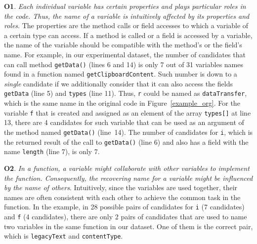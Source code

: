 \textbf{O1}. \textit{Each individual variable has certain properties
  and plays particular roles in the code. Thus, the name of a variable
  is intuitively affected by its properties and roles}. The properties
are the method calls or field accesses to which a variable of a certain
type can access.
%
If a method is called or a field is accessed
by a variable, the name of the variable should be compatible with the
method's or the field's name.
%
%
%
For example, in our experimental dataset,
the number of candidates that can call method \texttt{getData()}
(lines 6 and 14) is only 7 out of 31 variables names found in a
function named \texttt{getClipboardContent}.
%
%
Such number is down to a \textit{single} candidate if we additionally
consider that it can also access the fields \texttt{getData} (line 5)
and \texttt{types} (line 11). Thus, \texttt{r} could be named
as \texttt{dataTransfer}, which is the same name in the
original code in Figure~\ref{example_org}. For the variable \texttt{f}
that is created and assigned as an element of the array
\texttt{types[]} at line 13, there are 4 candidates for such
variable that can be used as an argument of the method named
\texttt{getData()} (line~14). The number of candidates for \texttt{i},
which is the returned result of the call to \texttt{getData()} (line
6) and also has a field with the name \texttt{length} (line 7), is
only 7.

%
\textbf{O2}. \textit{In a function, a variable might collaborate with
  other variables to implement the function. Consequently, the
  recovering name for a variable might be influenced by the name of
  others}. Intuitively, since the variables are used together, their
names are often consistent with each other to achieve the
common task in the function.
%
In the example, in 28 possible pairs of candidates for \texttt{i} (7
candidates) and \texttt{f} (4 candidates), there are only 2 pairs of
candidates that are used to name two variables in the same function
in our dataset. One of them is the correct pair, which is
\texttt{legacyText} and \texttt{contentType}.
%

